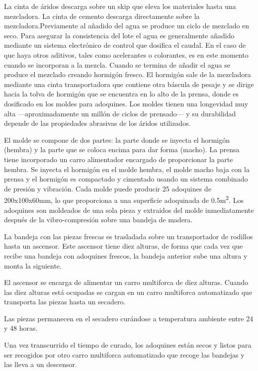 La cinta de áridos descarga sobre un skip que eleva los materiales hasta una mezcladora. La cinta de cemento descarga directamente sobre la mezcladora.Previamente al añadido del agua se produce un ciclo de mezclado en seco. Para asegurar la consistencia del lote el agua es generalmente añadido mediante un sistema electrónico de control que dosifica el caudal. En el caso de que haya otros aditivos, tales como acelerantes o colorantes, es en este momento cuando se incorporan a la mezcla. Cuando se termina de añadir el agua se produce el mezclado creando hormigón fresco. El hormigón sale de la mezcladora mediante una cinta transportadora que contiene otra báscula de pesaje y se dirige hacia la tolva de hormigón que se encuentra en lo alto de la prensa, donde es dosificado en los moldes para adoquines. Los moldes tienen una longevidad muy alta —aproximadamente un millón de ciclos de prensado— y su durabilidad depende de las propiedades abrasivas de los áridos utilizados.

El molde se compone de dos partes: la parte donde se inyecta el hormigón (hembra) y la parte que se coloca encima para dar forma (macho). La prensa tiene incorporado un carro alimentador encargado de proporcionar la parte hembra. Se inyecta el hormigón en el molde hembra, el molde macho baja con la prensa y el hormigón es compactado y cimentado usando un sistema combinado de presión y vibración. Cada molde puede producir 25 adoquines de 200x100x60\si{\milli\meter}, lo que proporciona a una superficie adoquinada de 0.5\si{\square\meter}. Los adoquines son moldeados de una sola pieza y extraidos del molde inmediatamente después de la vibro-compresión sobre una bandeja de madera.

La bandeja con las piezas frescas es trasladada sobre un transportador de rodillos hasta un ascensor. Este ascensor tiene diez alturas, de forma que cada vez que recibe una bandeja con adoquines frescos, la bandeja anterior sube una altura y monta la siguiente.

El ascensor se encarga de alimentar un carro multiforca de diez alturas. Cuando las diez alturas está ocupadas se cargan en un carro multiforca automatizado que transporta las piezas hasta un secadero.

Las piezas permanecen en el secadero curándose a temperatura ambiente entre 24 y 48 horas.

Una vez transcurrido el tiempo de curado, los adoquines están secos y listos para ser recogidos por otro carro multiforca automatizado que recoge las bandejas y las lleva a un descensor.


